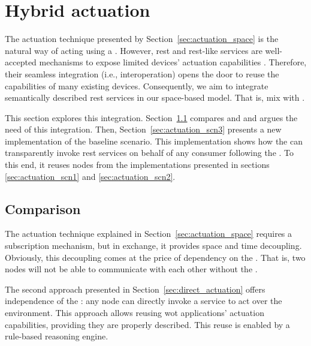 \section{Hybrid actuation}
\label{sec:hybrid_actuation}

The actuation technique presented by Section~\ref{sec:actuation_space} is the natural way of acting using a \Space{}.
However, \ac{rest} and \ac{rest}-like services are well-accepted mechanisms to expose limited devices' actuation capabilities \citep{guinard_internet_2011}. %
Therefore, their seamless integration (i.e., interoperation) opens the door to reuse the capabilities of many existing devices.
Consequently, we aim to integrate semantically described \ac{rest} services in our space-based model. %
That is, mix \spaceActuation{} with \restActuation{}.


This section explores this integration.
Section~\ref{sec:actuation_comparison} compares \spaceActuation{} and \restActuation{} and argues the need of this integration.
Then, Section~\ref{sec:actuation_scn3} presents a new implementation of the baseline scenario.
This implementation shows how the \Space{} can transparently invoke \ac{rest} services on behalf of any consumer following the \spaceActuation{}.
To this end, it reuses nodes from the implementations presented in sections \ref{sec:actuation_scn1} and \ref{sec:actuation_scn2}.


\subsection{Comparison}
\label{sec:actuation_comparison}

The actuation technique explained in Section~\ref{sec:actuation_space} requires a subscription mechanism, but in exchange, it provides space and time decoupling.
Obviously, this decoupling comes at the price of dependency on the \Space{}.
That is, two nodes will not be able to communicate with each other without the \Space{}.


The second approach presented in Section~\ref{sec:direct_actuation} offers independence of the \Space{}: any node can directly invoke a service to act over the environment.
This approach allows reusing \ac{wot} applications' actuation capabilities, providing they are properly described. %
This reuse is enabled by a rule-based reasoning engine. %


